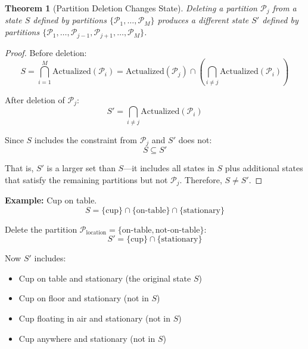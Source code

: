 \documentclass[twocolumn,10pt]{article}
\newtheorem{theorem}{Theorem}[section]
\theoremstyle{definition}
\theoremstyle{remark}
\begin{document}
\begin{theorem}[Partition Deletion Changes State]
\label{thm:deletion_changes_state}
Deleting a partition $\mathcal{P}_j$ from a state $S$ defined by partitions $\{\mathcal{P}_1, \ldots, \mathcal{P}_M\}$ produces a different state $S'$ defined by partitions $\{\mathcal{P}_1, \ldots, \mathcal{P}_{j-1}, \mathcal{P}_{j+1}, \ldots, \mathcal{P}_M\}$.
\end{theorem}

\begin{proof}
Before deletion:
\begin{equation}
S = \bigcap_{i=1}^{M} \text{Actualized}(\mathcal{P}_i) = \text{Actualized}(\mathcal{P}_j) \cap \left(\bigcap_{i \neq j} \text{Actualized}(\mathcal{P}_i)\right)
\end{equation}

After deletion of $\mathcal{P}_j$:
\begin{equation}
S' = \bigcap_{i \neq j} \text{Actualized}(\mathcal{P}_i)
\end{equation}

Since $S$ includes the constraint from $\mathcal{P}_j$ and $S'$ does not:
\begin{equation}
S \subseteq S'
\end{equation}

That is, $S'$ is a larger set than $S$—it includes all states in $S$ plus additional states that satisfy the remaining partitions but not $\mathcal{P}_j$. Therefore, $S \neq S'$.
\end{proof}

\noindent\textbf{Example:} Cup on table.
\begin{equation}
S = \{\text{cup}\} \cap \{\text{on-table}\} \cap \{\text{stationary}\}
\end{equation}

Delete the partition $\mathcal{P}_{\text{location}} = \{\text{on-table}, \text{not-on-table}\}$:
\begin{equation}
S' = \{\text{cup}\} \cap \{\text{stationary}\}
\end{equation}

Now $S'$ includes:
\begin{itemize}
\item Cup on table and stationary (the original state $S$)
\item Cup on floor and stationary (not in $S$)
\item Cup floating in air and stationary (not in $S$)
\item Cup anywhere and stationary (not in $S$)
\end{itemize}
\end{document}
